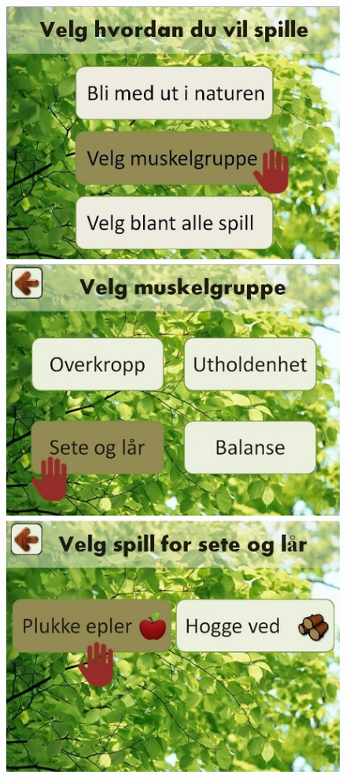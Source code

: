 \begin{figure} [H]
\centering
\includegraphics[scale=0.45]{menuStep1.jpg}
\label{app:menu1Norsk}
\end{figure}


